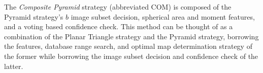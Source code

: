 The \textit{Composite Pyramid} strategy (abbreviated COM) is composed of the Pyramid strategy's $b$ image subset decision, spherical area and moment features, and a voting based confidence check.
This method can be thought of as a combination of the Planar Triangle strategy and the Pyramid strategy, borrowing the features, database range search, and optimal map determination strategy of the former while borrowing the image subset decision and confidence check of the latter.

%


%    
